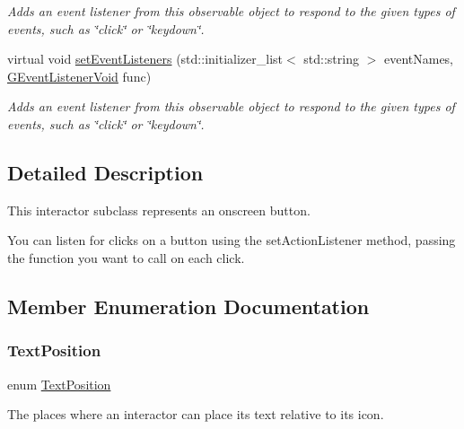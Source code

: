 \begin{DoxyCompactItemize}
\begin{DoxyCompactList}\small\item\em Adds an event listener from this observable object to respond to the given types of events, such as \char`\"{}click\char`\"{} or \char`\"{}keydown\char`\"{}. \end{DoxyCompactList}\item 
virtual void \mbox{\hyperlink{classsgl_1_1GObservable_a7867184bbb686f74fae8a4db927da799}{set\+Event\+Listeners}} (std\+::initializer\+\_\+list$<$ std\+::string $>$ event\+Names, \mbox{\hyperlink{namespacesgl_a54427ce97bb1c2804e4fe2b0a62e8b17}{G\+Event\+Listener\+Void}} func)
\begin{DoxyCompactList}\small\item\em Adds an event listener from this observable object to respond to the given types of events, such as \char`\"{}click\char`\"{} or \char`\"{}keydown\char`\"{}. \end{DoxyCompactList}\end{DoxyCompactItemize}


\subsection{Detailed Description}
This interactor subclass represents an onscreen button. 

You can listen for clicks on a button using the set\+Action\+Listener method, passing the function you want to call on each click. 

\subsection{Member Enumeration Documentation}
\mbox{\label{classsgl_1_1GInteractor_a8e0d441725a81d2bbdebbea09078260e}} 
\subsubsection{\texorpdfstring{Text\+Position}{TextPosition}}
{\footnotesize\ttfamily enum \mbox{\hyperlink{classsgl_1_1GInteractor_a8e0d441725a81d2bbdebbea09078260e}{Text\+Position}}\hspace{0.3cm}{\ttfamily [inherited]}}



The places where an interactor can place its text relative to its icon. 

